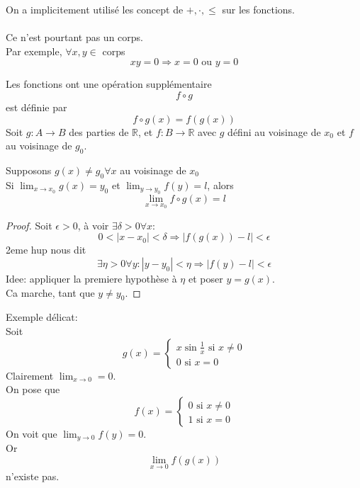 \documentclass[../main.tex]{subfiles}
\begin{document}
\begin{rmq}
On a implicitement utilisé les concept de $+, \cdot, \leq$ sur les fonctions.\\
\hr\\
Ce n'est pourtant pas un corps.\\
Par exemple, $\forall x,y \in $ corps
\[ 
xy=0 \Rightarrow x=0 \text{ ou } y=0
\]

\end{rmq}
Les fonctions ont une opération supplémentaire
\[ 
f \circ g
\]
est définie par 
\[ 
	f\circ g ( x) = f(g(x))
\]
Soit $g: A \to B$ des parties de $\mathbb{R}$, et $f:B \to \mathbb{R}$
avec $g$ défini au voisinage de $x_0$ et $f$ au voisinage de $ g_0$.\\
\begin{propo}
	Supposons $g(x) \neq g_0 \forall x$ au voisinage de $ x_0$\\
	Si $\lim_{x \to x_0} g(x) =y_0$ et $\lim_{y \to y_0} f(y) = l $, alors
	\[ 
		\lim_{x \to x_0} f\circ g ( x) =l 
	\]
\end{propo}
\begin{proof}
Soit $\epsilon>0$, à voir $\exists \delta>0 \forall x:$ 
\[ 
	0< |x-x_0| < \delta \Rightarrow |f(g(x)) -l | < \epsilon
\]
2eme hup nous dit
\[ 
	\exists \eta > 0 \forall y: |y-y_0| <\eta \Rightarrow |f(y)-l| < \epsilon
\]
Idee: appliquer la premiere hypothèse à $\eta$ et poser $y=g(x)$.\\
Ca marche, tant que $y\neq y_0$.
\end{proof}
\begin{exemple}
Exemple délicat:\\
Soit
\[ 
	g(x) =
	\begin{cases}
x\sin \frac{1}{x} \text{ si } x\neq 0\\
0 \text{ si } x=0
	\end{cases}
\]
Clairement $\lim_{x \to 0} =0$.\\
On pose que
\[ 
	f(x)=
	\begin{cases}
	0 \text{ si } x\neq 0\\
	1 \text{ si } x=0
	\end{cases}
\]
On voit que $\lim_{y \to 0} f(y) = 0$.\\
Or 
\[ 
	\lim_{x \to 0} f(g(x))
\]
n'existe pas.


\end{exemple}
\end{document}
